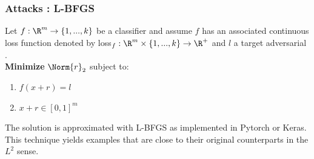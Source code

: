 \begin{frame}
\frametitle{Attacks : L-BFGS}
Let $f : \R^m \to \{1,...,k\}$ be a classifier and assume $f$ has an associated continuous loss function denoted by loss$_f : \R^m \times \{1,...,k\} \to \R^+$ and $l$ a target adversarial . \\
\textbf{ Minimize} $\Norm{r}_2$ subject to:
\begin{enumerate}[1.]
\item $f(x + r) = l$
\item $x + r \in [0,1]^m$
\end{enumerate}

The solution is approximated with L-BFGS as implemented in Pytorch or Keras. This technique yields examples that are close to their original counterparts in the $L^2$ sense.
\end{frame}
